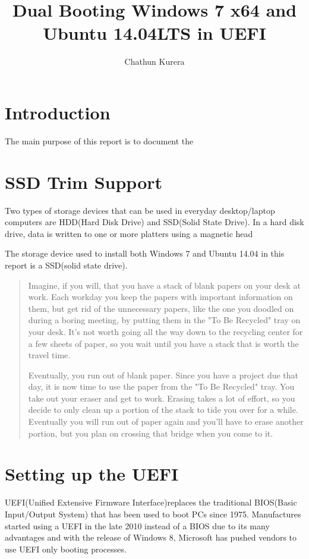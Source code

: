 \documentclass[11pt,letterpaper]{article}
\author{Chathun Kurera}
\title{Dual Booting Windows 7 x64 and Ubuntu 14.04LTS in UEFI}
\begin{document}
\onehalfspacing

\section{Introduction}
The main purpose of this report is to document the  

\section{SSD Trim Support}

Two types of storage devices that can be used in everyday desktop/laptop computers are HDD(Hard Disk Drive) and SSD(Solid State Drive). In a hard disk drive, data is written to one or more platters using a magnetic head 


The storage device used to install both Windows 7 and Ubuntu 14.04 in this report is a SSD(solid state drive). 


\begin{quote}
Imagine, if you will, that you have a stack of blank papers on your desk at work. Each workday you keep the papers with important information on them, but get rid of the unnecessary papers, like the one you doodled on during a boring meeting, by putting them in the "To Be Recycled" tray on your desk. It's not worth going all the way down to the recycling center for a few sheets of paper, so you wait until you have a stack that is worth the travel time.

Eventually, you run out of blank paper. Since you have a project due that day, it is now time to use the paper from the "To Be Recycled" tray. You take out your eraser and get to work. Erasing takes a lot of effort, so you decide to only clean up a portion of the stack to tide you over for a while. Eventually you will run out of paper again and you'll have to erase another portion, but you plan on crossing that bridge when you come to it. 
\end{quote}


\section{Setting up the UEFI}
UEFI(Unified Extensive Firmware Interface)replaces the traditional BIOS(Basic Input/Output System) that has been used to boot PCs since 1975. Manufactures started using a UEFI in the late 2010 instead of a BIOS due to its many advantages and with the release of Windows 8, Microsoft has pushed vendors to use UEFI only booting processes.
\end{document}

